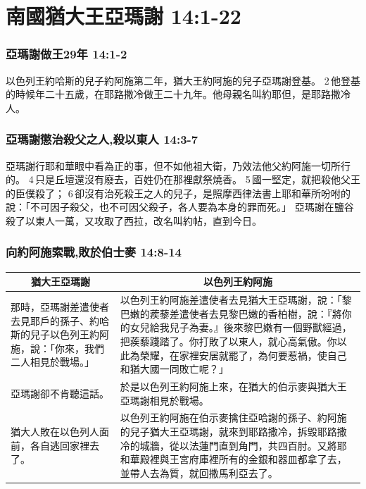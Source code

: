 \section{南國猶大王亞瑪謝 14:1-22 }
\subsubsection{亞瑪謝做王29年 14:1-2 }
以色列王約哈斯的兒子約阿施第二年，猶大王約阿施的兒子亞瑪謝登基。 2 他登基的時候年二十五歲，在耶路撒冷做王二十九年。他母親名叫約耶但，是耶路撒冷人。

\subsubsection{亞瑪謝懲治殺父之人,殺以東人 14:3-7}
亞瑪謝行耶和華眼中看為正的事，但不如他祖大衛，乃效法他父約阿施一切所行的。 4 只是丘壇還沒有廢去，百姓仍在那裡獻祭燒香。 5 國一堅定，就把殺他父王的臣僕殺了； 6 卻沒有治死殺王之人的兒子，是照摩西律法書上耶和華所吩咐的說：「不可因子殺父，也不可因父殺子，各人要為本身的罪而死。」
亞瑪謝在鹽谷殺了以東人一萬，又攻取了西拉，改名叫約帖，直到今日。

\subsubsection{向約阿施索戰,敗於伯士麥 14:8-14 }
\begin{table}[H]
\hspace{-5mm}
\centering
\begin{tabular}{p{4.5cm}|p{}}\hline
\multicolumn{1}{c|}{猶大王亞瑪謝}&\multicolumn{1}{c}{以色列王約阿施}\\\hline
那時，亞瑪謝差遣使者去見耶戶的孫子、約哈斯的兒子以色列王約阿施，說：「你來，我們二人相見於戰場。」&以色列王約阿施差遣使者去見猶大王亞瑪謝，說：「黎巴嫩的蒺藜差遣使者去見黎巴嫩的香柏樹，說：『將你的女兒給我兒子為妻。』後來黎巴嫩有一個野獸經過，把蒺藜踐踏了。你打敗了以東人，就心高氣傲。你以此為榮耀，在家裡安居就罷了，為何要惹禍，使自己和猶大國一同敗亡呢？」\\\hline
亞瑪謝卻不肯聽這話。&於是以色列王約阿施上來，在猶大的伯示麥與猶大王亞瑪謝相見於戰場。\\\hline
猶大人敗在以色列人面前，各自逃回家裡去了。&以色列王約阿施在伯示麥擒住亞哈謝的孫子、約阿施的兒子猶大王亞瑪謝，就來到耶路撒冷，拆毀耶路撒冷的城牆，從以法蓮門直到角門，共四百肘。又將耶和華殿裡與王宮府庫裡所有的金銀和器皿都拿了去，並帶人去為質，就回撒馬利亞去了。\\\hline
\end{tabular}
\end{table}


